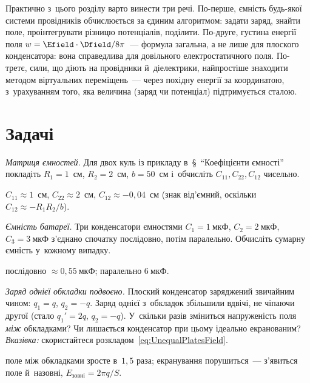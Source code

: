 Практично з~цього розділу варто винести три речі. По-перше, ємність будь-якої системи
провідників обчислюється за єдиним алгоритмом: задати заряд, знайти поле, проінтегрувати
різницю потенціалів, поділити. По-друге, густина енергії поля $w =
\Efield\cdot\Dfield/8\pi$~--- формула загальна, а не лише для плоского конденсатора: вона
справедлива для довільного електростатичного поля. По-третє, сили, що діють на провідники
й~діелектрики, найпростіше знаходити методом віртуальних переміщень~--- через похідну
енергії за координатою, з~урахуванням того, яка величина (заряд чи потенціал)
підтримується сталою.



\section*{Задачі}
 {}


\begin{problem}\label{prb:CapacitanceMatrix}
	\emph{Матриця ємностей\ExtraMark.} Для двох куль із прикладу в~\S~\enquote{Коефіцієнти ємності} покладіть $R_1=1$~см,
	$R_2=2$~см, $b=50$~см і~обчисліть $C_{11}, C_{22}, C_{12}$ чисельно.
	\begin{solution}
		$C_{11} \approx 1$~см, $C_{22} \approx 2$~см, $C_{12} \approx -0{,}04$~см (знак від'ємний, оскільки $C_{12} \approx -R_1R_2/b$).
	\end{solution}
\end{problem}

\begin{problem}\label{prb:CapacitorBank}
	\emph{Ємність батареї.} Три конденсатори ємностями $C_1 = 1\ \text{мкФ}$, $C_2 = 2\
	\text{мкФ}$, $C_3 = 3\ \text{мкФ}$ з'єднано спочатку послідовно, потім паралельно.
	Обчисліть сумарну ємність у~кожному випадку.
	\begin{solution}
		послідовно $\approx 0{,}55\ \text{мкФ}$; паралельно $6\ \text{мкФ}$.
	\end{solution}
\end{problem}

\begin{problem}\label{prb:UnequalCharges}
	\emph{Заряд однієї обкладки подвоєно.} Плоский конденсатор заряджений звичайним
	чином: $q_1=q$, $q_2=-q$. Заряд однієї з~обкладок збільшили вдвічі, не чіпаючи другої
	(стало $q_1'=2q$, $q_2=-q$). У~скільки разів зміниться напруженість поля \emph{між}
	обкладками? Чи лишається конденсатор при цьому ідеально екранованим? \emph{Вказівка:}
	скористайтеся розкладом~\eqref{eq:UnequalPlatesField}.
	\begin{solution}
		поле між обкладками зросте в~$1{,}5$ раза; екранування порушиться~--- з'явиться поле й~назовні, $E_\text{зовні}=2\pi q/S$.
	\end{solution}
\end{problem}

